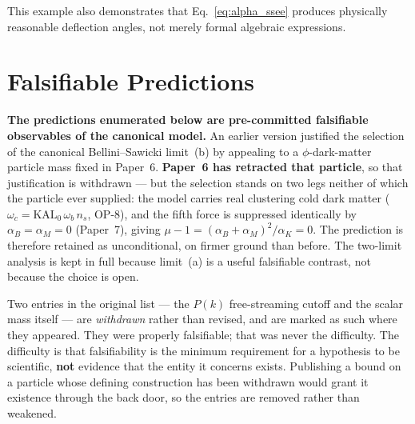 \documentclass[12pt,a4paper]{article}
\begin{document}
This example also demonstrates that Eq.~\eqref{eq:alpha_ssee} produces
physically reasonable deflection angles, not merely formal algebraic
expressions.

\section{Falsifiable Predictions}
\label{sec:falsify}

\begin{tcolorbox}[colback=green!4,colframe=green!50!black,title=Scope of falsifiability --- revised 2026-08]
\textbf{The predictions enumerated below are pre-committed falsifiable
observables of the canonical model.} An earlier version justified the selection
of the canonical Bellini--Sawicki limit~(b) by appealing to a $\phi$-dark-matter
particle mass fixed in Paper~6. \textbf{Paper~6 has retracted that particle},
so that justification is withdrawn --- but the selection stands on two legs
neither of which the particle ever supplied: the model carries real clustering
cold dark matter ($\omega_c=\mathrm{KAL}_0\,\omega_b\,n_s$, OP-8), and the
fifth force is suppressed identically by $\alpha_B=\alpha_M=0$ (Paper~7), giving
$\mu-1=(\alpha_B+\alpha_M)^2/\alpha_K=0$. The prediction is therefore retained
as unconditional, on firmer ground than before. The two-limit analysis is kept
in full because limit~(a) is a useful falsifiable contrast, not because the
choice is open.

Two entries in the original list --- the $P(k)$ free-streaming cutoff and the
scalar mass itself --- are \emph{withdrawn} rather than revised, and are
marked as such where they appeared. They were properly falsifiable; that was
never the difficulty. The difficulty is that falsifiability is the minimum
requirement for a hypothesis to be scientific, \textbf{not} evidence that the
entity it concerns exists. Publishing a bound on a particle whose defining
construction has been withdrawn would grant it existence through the back
door, so the entries are removed rather than weakened.
\end{tcolorbox}
\end{document}
